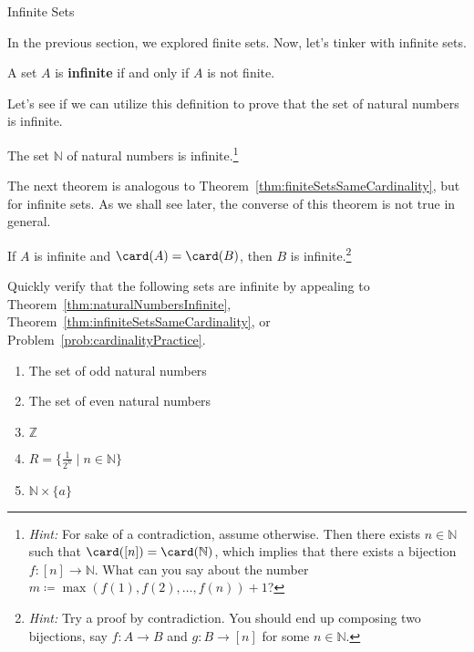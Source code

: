 \begin{section}{Infinite Sets}

In the previous section, we explored finite sets.  Now, let's tinker with infinite sets.

\begin{definition}\label{def:infiniteSet}
A set $A$ is \textbf{infinite} if and only if $A$ is not finite.
\end{definition}

Let's see if we can utilize this definition to prove that the set of natural numbers is infinite.

\begin{theorem}\label{thm:naturalNumbersInfinite}
The set $\mathbb{N}$ of natural numbers is infinite.\footnote{\emph{Hint:} For sake of a contradiction, assume otherwise.  Then there exists $n\in\mathbb{N}$ such that $\card([n])=\card(\mathbb{N})$, which implies that there exists a bijection $f:[n]\to \mathbb{N}$. What can you say about the number $m\coloneqq \max(f(1),f(2),\ldots,f(n))+1$?}
\end{theorem}

The next theorem is analogous to Theorem~\ref{thm:finiteSetsSameCardinality}, but for infinite sets. As we shall see later, the converse of this theorem is not true in general.

\begin{theorem}\label{thm:infiniteSetsSameCardinality}
If $A$ is infinite and $\card(A)=\card(B)$, then $B$ is infinite.\footnote{\emph{Hint:} Try a proof by contradiction. You should end up composing two bijections, say $f:A\to B$ and $g:B\to [n]$ for some $n\in\mathbb{N}$.}
\end{theorem}

\begin{problem}\label{prob:someInfiniteSets}
Quickly verify that the following sets are infinite by appealing to Theorem~\ref{thm:naturalNumbersInfinite}, Theorem~\ref{thm:infiniteSetsSameCardinality}, or Problem~\ref{prob:cardinalityPractice}.
\begin{enumerate}[label=\textrm{(\alph*)}]
\item The set of odd natural numbers
\item The set of even natural numbers
\item $\mathbb{Z}$
\item $R=\{\frac{1}{2^n}\mid n\in \mathbb{N}\}$
\item $\mathbb{N}\times \{a\}$
\end{enumerate}
\end{problem}


\end{section}
